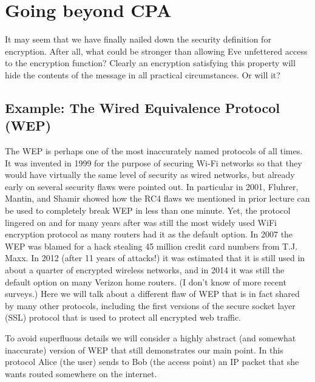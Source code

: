\section{Going beyond CPA}\label{Going-beyond-CPA}

It may seem that we have finally nailed down the security definition for
encryption. After all, what could be stronger than allowing Eve
unfettered access to the encryption function? Clearly an encryption
satisfying this property will hide the contents of the message in all
practical circumstances. Or will it?


\subsection{Example: The Wired Equivalence Protocol
(WEP)}\label{Example-The-Wired-Equivalence-}

The WEP is perhaps one of the most inaccurately named protocols of all
times. It was invented in 1999 for the purpose of securing Wi-Fi
networks so that they would have virtually the same level of security as
wired networks, but already early on several security flaws were pointed
out. In particular in 2001, Fluhrer, Mantin, and Shamir showed how the
RC4 flaws we mentioned in prior lecture can be used to completely break
WEP in less than one minute. Yet, the protocol lingered on and for many
years after was still the most widely used WiFi encryption protocol as
many routers had it as the default option. In 2007 the WEP was blamed
for a hack stealing 45 million credit card numbers from T.J. Maxx. In
2012 (after 11 years of attacks!) it was estimated that it is still used
in about a quarter of encrypted wireless networks, and in 2014 it was
still the default option on many Verizon home routers. (I don't know of
more recent surveys.) Here we will talk about a different flaw of WEP
that is in fact shared by many other protocols, including the first
versions of the secure socket layer (SSL) protocol that is used to
protect all encrypted web traffic.

To avoid superfluous details we will consider a highly abstract (and
somewhat inaccurate) version of WEP that still demonstrates our main
point. In this protocol Alice (the user) sends to Bob (the access point)
an IP packet that she wants routed somewhere on the internet.

